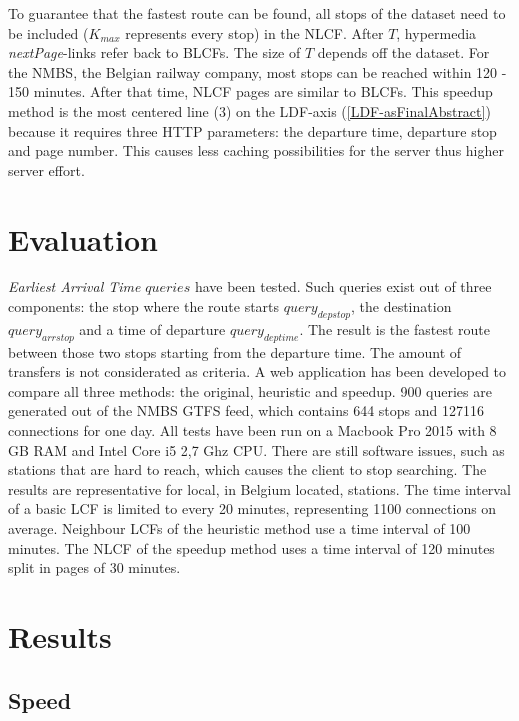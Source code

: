\documentclass[twocolumn]{phdsymp} %
\begin{document}
To guarantee that the fastest route can be found, all stops of the dataset need to be included ($K_{max}$ represents every stop) in the NLCF. After $T$, hypermedia \textit{nextPage}-links refer back to BLCFs. The size of $T$ depends off the dataset. For the NMBS, the Belgian railway company, most stops can be reached within 120 - 150 minutes. After that time, NLCF pages are similar to BLCFs.
This speedup method is the most centered line (3) on the LDF-axis (\cref{LDF-asFinalAbstract}) because it requires three HTTP parameters: the departure time, departure stop and page number. This causes less caching possibilities for the server thus higher server effort.

\section{Evaluation}
\label{evaluation}

\textit{Earliest Arrival Time} $queries$ have been tested. Such queries exist out of three components: the stop where the route starts $query_{depstop}$, the destination $query_{arrstop}$ and a time of departure $query_{deptime}$. The result is the fastest route between those two stops starting from the departure time. The amount of transfers is not considerated as criteria.
A web application has been developed to compare all three methods: the original, heuristic and speedup. 900 queries are generated out of the NMBS GTFS feed, which contains 644 stops and 127116 connections for one day.  All tests have been run on a Macbook Pro 2015 with 8 GB RAM and Intel Core i5 2,7 Ghz CPU. 
There are still software issues, such as stations that are hard to reach, which causes the client to stop searching. The results are representative for local, in Belgium located, stations. 
The time interval of a basic LCF is limited to every 20 minutes, representing 1100 connections on average. Neighbour LCFs of the heuristic method use a time interval of 100 minutes. The NLCF of the speedup method uses a time interval of 120 minutes split in pages of 30 minutes.

\section{Results}
\label{results}

\subsection{Speed}
\end{document}
